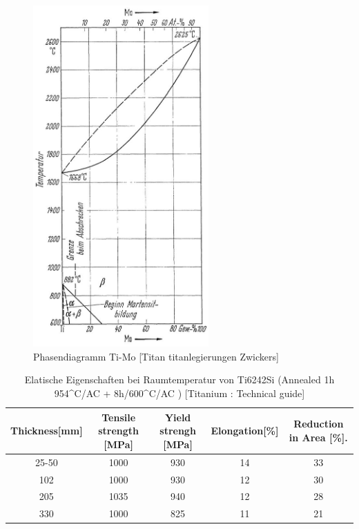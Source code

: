 \begin{figure}[H]
	\centering
	\includegraphics[width= 0.6\textwidth]{Bilder/TiMo}
	\caption{Phasendiagramm Ti-Mo [Titan titanlegierungen Zwickers]}
	\label{TiMo}
\end{figure}

\begin{table}[H]
	\small
	\tabcolsep=0.09cm
	\centering	
	\begin{tabular}{|c |c |c|c |c|}
		\hline
		\centering
		Thickness[mm] & Tensile strength [MPa] & Yield strengh [MPa] & Elongation[\%]& Reduction in Area [\%]. \\
		\hline
		25-50&1000&930&14&33\\
		102&1000&930&12&30\\
		205&1035&940&12&28\\
		330&1000&825&11&21\\
		
		\hline
	\end{tabular}
	\caption{Elatische Eigenschaften bei Raumtemperatur von Ti6242Si (Annealed 1h 954^\circ C/AC + 8h/600^\circ C/AC )  [Titanium : Technical guide]}
	\label{Mecprop}
\end{table}


